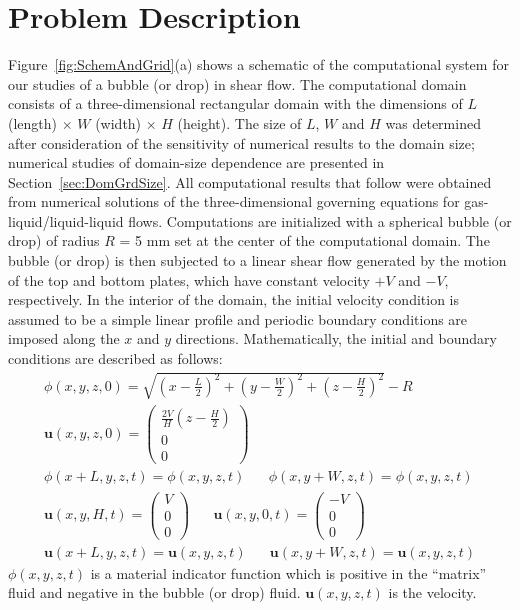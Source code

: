 \documentclass{elsarticle}
\newcommand{\vv}{\mathbf}
\newcommand{\bmu}{\vv{u}}
\begin{document}
\section{Problem Description}

Figure~\ref{fig:SchemAndGrid}(a) shows a schematic of the computational system for our studies of a bubble (or drop) in shear flow.  The computational domain consists of a three-dimensional rectangular domain with the dimensions of $L$ (length) $\times$ $W$ (width) $\times$ $H$ (height).  The size of $L$, $W$ and $H$ was determined after consideration of the sensitivity of numerical results to the domain size; numerical studies of domain-size dependence are presented in Section~\ref{sec:DomGrdSize}.  All computational results that follow were obtained from numerical solutions of the three-dimensional governing equations for gas-liquid/liquid-liquid flows.  Computations are initialized with a spherical bubble (or drop) of radius $R$ = 5 mm set at the center of the computational domain.   The bubble (or drop) is then subjected to a linear shear flow generated by the motion of the top and bottom plates, which have constant velocity $+V$ and $-V$, respectively.  In the interior of the domain, the initial velocity condition is assumed to be a simple linear profile and periodic boundary conditions are imposed along the $x$ and $y$ directions.  Mathematically, the initial and boundary conditions are described as follows: 
%
\begin{eqnarray}
	\phi(x,y,z,0)=\sqrt{(x-\frac{L}{2})^{2}+(y-\frac{W}{2})^{2}+
	(z-\frac{H}{2})^{2}}-R \label{IC_BC} \\
	\bmu(x,y,z,0)=\left( \begin{array}{c}
		\frac{2V}{H}(z-\frac{H}{2}) \\ 0 \\ 0 
	\end{array} \right) \nonumber \\
	\phi(x+L,y,z,t)=\phi(x,y,z,t) \hspace{20pt}
	\phi(x,y+W,z,t)=\phi(x,y,z,t) \nonumber \\
	\bmu(x,y,H,t)=\left( \begin{array}{c}
		                V \\ 0 \\ 0 
	\end{array} \right)  \hspace{20pt}
	\bmu(x,y,0,t)=\left( \begin{array}{c}
		                -V \\ 0 \\ 0 
	\end{array} \right)  \nonumber \\
	\bmu(x+L,y,z,t)=\bmu(x,y,z,t) \hspace{20pt} 
	\bmu(x,y+W,z,t)=\bmu(x,y,z,t) \nonumber
\end{eqnarray}
%
$\phi(x,y,z,t)$ is a material indicator function which is positive in the
``matrix'' fluid and negative in the bubble (or drop) fluid.  $\bmu(x,y,z,t)$
is the velocity.
\end{document}
